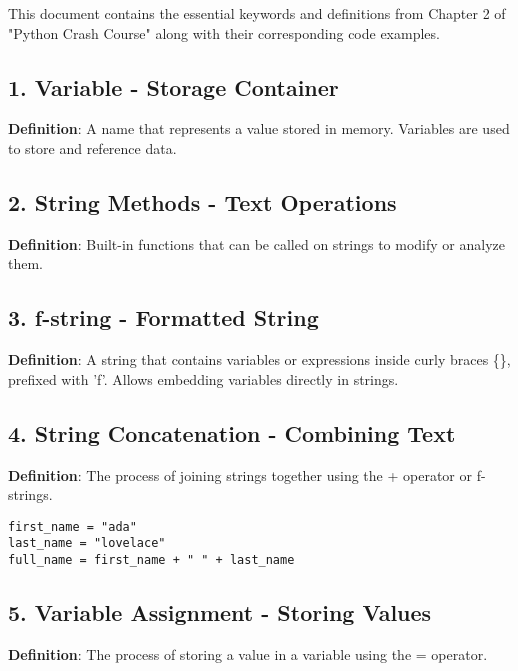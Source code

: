 
This document contains the essential keywords and definitions from Chapter 2 of "Python Crash Course" along with their corresponding code examples.

\subsection*{1. Variable - Storage Container}
\textbf{Definition}: A name that represents a value stored in memory. Variables are used to store and reference data.



\subsection*{2. String Methods - Text Operations}
\textbf{Definition}: Built-in functions that can be called on strings to modify or analyze them.



\subsection*{3. f-string - Formatted String}
\textbf{Definition}: A string that contains variables or expressions inside curly braces \{\}, prefixed with 'f'. Allows embedding variables directly in strings.



\subsection*{4. String Concatenation - Combining Text}
\textbf{Definition}: The process of joining strings together using the + operator or f-strings.

\begin{lstlisting}
first_name = "ada"
last_name = "lovelace"
full_name = first_name + " " + last_name
\end{lstlisting}

\subsection*{5. Variable Assignment - Storing Values}
\textbf{Definition}: The process of storing a value in a variable using the = operator.

